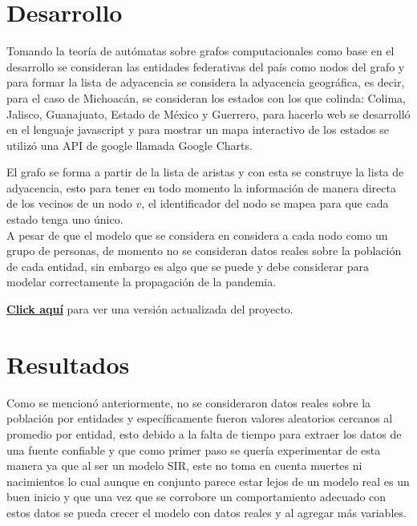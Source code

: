 \chapter{Desarrollo}
Tomando la teoría de autómatas sobre grafos computacionales como base en el desarrollo se consideran las entidades federativas del país como nodos del grafo y para formar la lista de adyacencia se considera la adyacencia geográfica, es decir, para el caso de Michoacán, se consideran los estados con los que colinda: Colima, Jalisco, Guanajuato, Estado de México y Guerrero, para hacerlo web se desarrolló en el lenguaje javascript y para mostrar un mapa interactivo de los estados se utilizó una API de google llamada Google Charts.

El grafo se forma a partir de la lista de aristas y con esta se construye la lista de adyacencia, esto para tener en todo momento la información de manera directa de los vecinos de un nodo $v$, el identificador del nodo se mapea para que cada estado tenga uno único.
\\ 
A pesar de que el modelo que se considera en \cite{cagraph} considera a cada nodo como un grupo de personas, de momento no se consideran datos reales sobre la población de cada entidad, sin embargo es algo que se puede y debe considerar para modelar correctamente la propagación de la pandemia.


\href{https://github.com/QApolo/CS/tree/master/05_CovidProj}{\textbf{Click aquí}} para ver una versión actualizada del proyecto.




\newpage


\lstset{inputencoding=utf8/latin1}


\chapter{Resultados}
Como se mencionó anteriormente, no se consideraron datos reales sobre la población por entidades y específicamente fueron valores aleatorios cercanos al promedio por entidad, esto debido a la falta de tiempo para extraer los datos de una fuente confiable y que como primer paso se quería experimentar de esta manera ya que al ser un modelo SIR, este no toma  en cuenta muertes ni nacimientos lo cual aunque en conjunto parece estar lejos de un modelo real es un buen inicio y que una vez que se corrobore un comportamiento adecuado con estos datos se pueda crecer el modelo con datos reales y al agregar más variables.
\newpage

